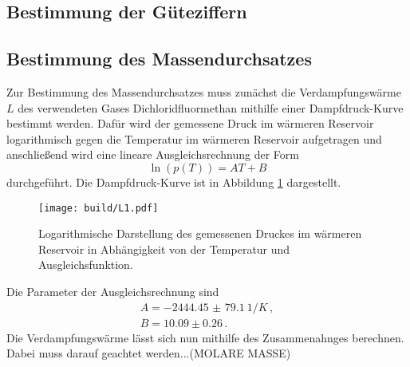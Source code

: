 \subsection{Bestimmung der Güteziffern}

\subsection{Bestimmung des Massendurchsatzes}

Zur Bestimmung des Massendurchsatzes muss zunächst die Verdampfungswärme $L$ des
verwendeten Gases Dichloridfluormethan mithilfe einer Dampfdruck-Kurve bestimmt werden.
Dafür wird der gemessene Druck im wärmeren Reservoir logarithmisch gegen die Temperatur im
wärmeren Reservoir aufgetragen und anschließend wird eine lineare Ausgleichsrechnung
der Form
\begin{equation}
  \ln(p(T))=AT+B
\end{equation}
durchgeführt.
Die Dampfdruck-Kurve ist in Abbildung \ref{fig:dampf} dargestellt.

\begin{figure}
  \centering
  \texttt{[image: build/L1.pdf]}
  \caption{Logarithmische Darstellung des gemessenen Druckes im wärmeren Reservoir
   in Abhängigkeit von der Temperatur und Ausgleichsfunktion.}
  \label{fig:dampf}
\end{figure}

Die Parameter der Ausgleichsrechnung sind
\begin{align*}
  A = \SI{-2444.45(7910)}{1/K}\,, \\
  B = 10.09\pm0.26 \,.
\end{align*}
Die Verdampfungswärme lässt sich nun mithilfe des Zusammenahnges
%
berechnen. Dabei muss darauf geachtet werden...(MOLARE MASSE)
